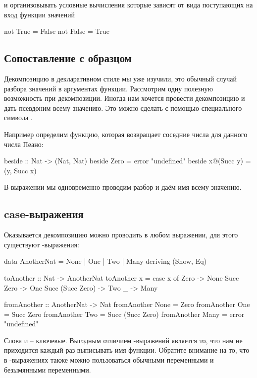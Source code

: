 \noindent и организовывать 
условные вычисления которые зависят от вида поступающих
на вход функции значений

\begin{code}
not True  = False
not False = True
\end{code}

\subsection{Сопоставление с образцом}

Декомпозицию в декларативном стиле мы уже изучили, это
обычный случай разбора значений в аргументах функции.
Рассмотрим одну полезную возможность при декомпозиции.
Иногда нам хочется провести декомпозицию и дать 
псевдоним всему значению. Это можно сделать
с помощью специального символа .

Например определим функцию, которая возвращает соседние
числа для данного числа Пеано:

\begin{code}
beside :: Nat -> (Nat, Nat)
beside  Zero       = error "undefined"
beside  x@(Succ y) = (y, Succ x)
\end{code}

В выражении  мы одновременно проводим
разбор и даём имя всему значению. 

\subsection{case-выражения}

Оказывается декомпозицию можно проводить в любом выражении,
для этого существуют  -выражения:

\begin{code}
data AnotherNat = None | One | Two | Many
    deriving (Show, Eq)

toAnother :: Nat -> AnotherNat
toAnother x = 
    case x of
        Zero                -> None
        Succ Zero           -> One
        Succ (Succ Zero)    -> Two
        _                   -> Many

fromAnother :: AnotherNat -> Nat
fromAnother None    = Zero
fromAnother One     = Succ Zero
fromAnother Two     = Succ (Succ Zero)
fromAnother Many    = error "undefined" 
\end{code}

Слова  и  -- ключевые. Выгодным отличием
-выражений является то, что нам не приходится
каждый раз выписывать имя функции. Обратите внимание
на то, что в -выражениях также можно пользоваться
обычными переменными и безымянными переменными.

